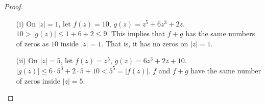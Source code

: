 \vspace{2ex}
\begin{proof}
\begin{itemize}
\item[(i)] On $|z|=1$, let $f(z)=10$, $g(z)=z^{5}+6z^3+2z$. $10>|g(z)|\leq 1+6+2\leq 9$. This implies that $f+g$ has the same numbers of zeros as $10$ inside $|z|=1$. That is, it has no zeros on $|z|=1$. 
\item[(ii)] On $|z|=5$, let $f(z)=z^{5}$, $g(z)=6z^3+2z+10$. $|g(z)|\leq 6\cdot 5^3+2\cdot 5+10<5^{5}=|f(z)|$. $f$ and $f+g$ have the same number of zeros inside $|z|=5$. 
\end{itemize}
\end{proof}
\vspace{2ex}
